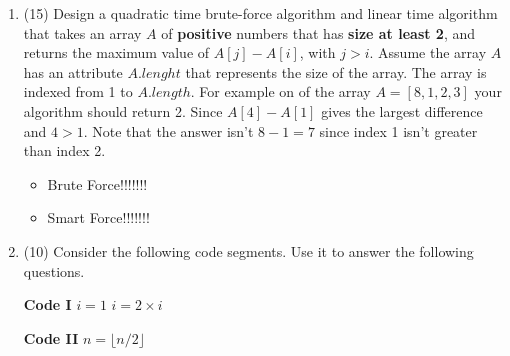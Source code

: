 \documentclass[12pt]{article}
\begin{document}
\begin{enumerate}
\item(15) Design a quadratic time brute-force algorithm and linear time algorithm that takes an 
array $A$ of \textbf{positive} numbers that has \textbf{size at least 2}, and returns the 
maximum value of $A[j]- A[i]$, with $j > i$. Assume the array $A$ has an attribute $A.lenght$ 
that represents the size of the array. The array is indexed from 1 to $A.length$.
For example on of the array $A = [8,1,2,3]$ your algorithm should return 2. Since $A[4]- A[1]$
gives the largest difference and $4 > 1$. Note that the answer isn't $8-1 = 7$ since index 1 
isn't greater than index 2.

\begin{itemize}

\item \begin{algorithm}[H]
\begin{algorithmic}
\State Brute Force!!!!!!!
\EndProcedure
\end{algorithmic}
\end{algorithm}

\item \begin{algorithm}[H]
\begin{algorithmic}
\State Smart Force!!!!!!!
\EndProcedure
\end{algorithmic}
\end{algorithm}

\end{itemize}

\item (10) Consider the following code segments. Use it to answer the following questions.

\begin{algorithm}[H]
\begin{algorithmic}
\State \textbf{Code I}
\State
\State $i = 1$
 \State $i = 2 \times i$
\EndWhile
\end{algorithmic}
\end{algorithm}

\begin{algorithm}[H]
\begin{algorithmic}
\State \textbf{Code II}
\State
{}
 \State $n = \lfloor n/2 \rfloor$
\EndWhile
\end{algorithmic}
\end{algorithm}


\end{enumerate}
\end{document}
